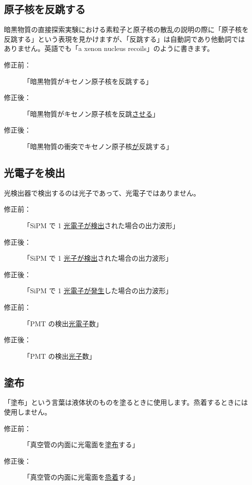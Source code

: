 \subsection{原子核を反跳する}

暗黒物質の直接探索実験における素粒子と原子核の散乱の説明の際に「原子核を反跳する」という表現を見かけますが、「反跳する」は自動詞であり他動詞ではありません。英語でも「a xenon nucleus recoils」のように書きます。

\begin{description}
\item[修正前：]「暗黒物質がキセノン原子核を反跳する」
\item[修正後：]「暗黒物質がキセノン原子核を反跳\underline{させる}」
\item[修正後：]「暗黒物質の衝突でキセノン原子核\underline{が}反跳する」
\end{description}

\subsection{光電子を検出}

光検出器で検出するのは光子であって、光電子ではありません。

\begin{description}
\item[修正前：]「SiPM で 1 \underline{光電子が検出}された場合の出力波形」
\item[修正後：]「SiPM で 1 \underline{光子が検出}された場合の出力波形」
\item[修正後：]「SiPM で 1 \underline{光電子が発生}した場合の出力波形」
\end{description}

\begin{description}
\item[修正前：]「PMT の検出\underline{光電子}数」
\item[修正後：]「PMT の検出\underline{光子}数」
\end{description}

\subsection{塗布}

「塗布」という言葉は液体状のものを塗るときに使用します。烝着するときには使用しません。

\begin{description}
\item[修正前：]「真空管の内面に光電面を\underline{塗布}する」
\item[修正後：]「真空管の内面に光電面を\underline{烝着}する」
\end{description}

